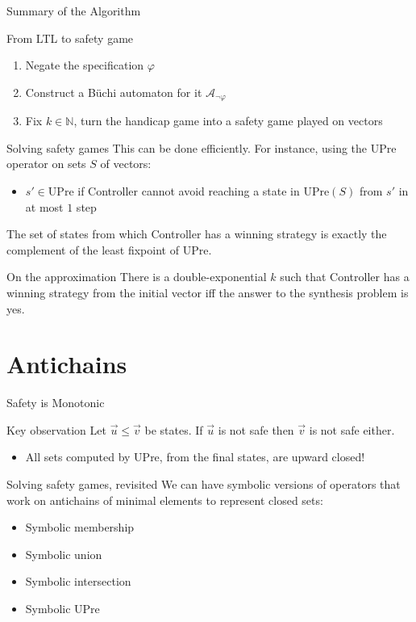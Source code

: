 \documentclass[aspectratio=169]{beamer}
\begin{document}
\begin{frame}{Summary of the Algorithm}
  \begin{block}{From LTL to safety game}
    \begin{enumerate}
      \item Negate the specification $\varphi$
      \item Construct a B\"uchi automaton for it $\mathcal{A}_{\lnot \varphi}$
      \item Fix $k \in \mathbb{N}$, turn the handicap game into a
        \alert{safety game} played on vectors
    \end{enumerate}
  \end{block}
  \pause
  \begin{block}{Solving safety games}
    This can be done efficiently. For instance, using the \alert{UPre}
    operator on sets $S$ of vectors: 
    \begin{itemize}
      \item $s' \in \mathrm{UPre}$ if Controller cannot avoid
        reaching a state in $\mathrm{UPre}(S)$ from $s'$ in at most $1$ step
    \end{itemize}
    The set of states from which Controller has a winning strategy is exactly
    the \alert{complement} of the least fixpoint of UPre. 
  \end{block}
  \pause
  \begin{block}{On the approximation}
    There is a double-exponential $k$ such that Controller has a winning
    strategy from the initial vector iff the answer to the synthesis problem
    is \alert{yes}.
  \end{block}
\end{frame}

\section{Antichains}

\begin{frame}{Safety is Monotonic}
  \begin{block}{Key observation}
    Let $\vec{u} \leq \vec{v}$ be states. If $\vec{u}$ is \alert{not safe} then
    $\vec{v}$ is not safe either.
    \begin{itemize}
      \item All sets computed by UPre, from the final states, are \alert{upward
        closed}!
    \end{itemize}
  \end{block}
  \pause
  \begin{block}{Solving safety games, revisited}
    We can have \alert{symbolic} versions of operators that work on
    antichains of \alert{minimal elements} to represent closed sets:
    \begin{itemize}
      \item Symbolic membership
      \item Symbolic union
      \item Symbolic intersection
      \item Symbolic UPre
    \end{itemize}
  \end{block}
\end{frame}
\end{document}
